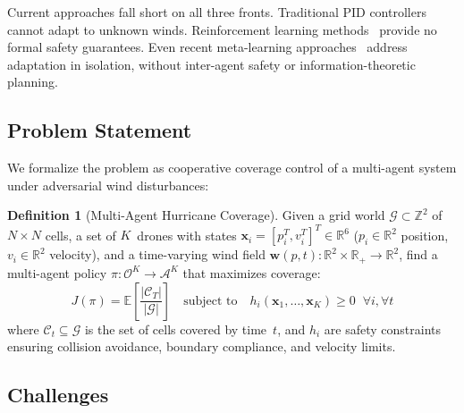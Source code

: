 \documentclass[11pt,twocolumn]{article}
\theoremstyle{definition}
\newtheorem{definition}[theorem]{Definition}
\newcommand{\R}{\mathbb{R}}
\newcommand{\EE}{\mathbb{E}}
\newcommand{\cA}{\mathcal{A}}
\newcommand{\cG}{\mathcal{G}}
\newcommand{\cC}{\mathcal{C}}
\newcommand{\cO}{\mathcal{O}}
\newcommand{\vect}[1]{\mathbf{#1}}
\begin{document}
Current approaches fall short on all three fronts. Traditional PID controllers~\citep{Duggal2020} cannot adapt to unknown winds. Reinforcement learning methods~\citep{PPO2017} provide no formal safety guarantees. Even recent meta-learning approaches~\citep{NeuralFly2022} address adaptation in isolation, without inter-agent safety or information-theoretic planning.

\subsection{Problem Statement}
\label{sec:problem}

We formalize the problem as cooperative coverage control of a multi-agent system under adversarial wind disturbances:

\begin{definition}[Multi-Agent Hurricane Coverage]
\label{def:coverage}
Given a grid world $\cG \subset \mathbb{Z}^2$ of $N \times N$ cells, a set of $K$~drones with states $\vect{x}_i = [p_i^T, v_i^T]^T \in \R^6$ ($p_i \in \R^2$ position, $v_i \in \R^2$ velocity), and a time-varying wind field $\vect{w}(p,t): \R^2 \times \R_+ \to \R^2$, find a multi-agent policy $\pi: \cO^K \to \cA^K$ that maximizes coverage:
\[
    J(\pi) = \EE\left[\frac{|\cC_T|}{|\cG|}\right] \quad \text{subject to} \quad h_i(\vect{x}_1, \ldots, \vect{x}_K) \geq 0 \;\; \forall i, \forall t
\]
where $\cC_t \subseteq \cG$ is the set of cells covered by time~$t$, and $h_i$ are safety constraints ensuring collision avoidance, boundary compliance, and velocity limits.
\end{definition}

\subsection{Challenges}
\label{sec:challenges}
\end{document}

